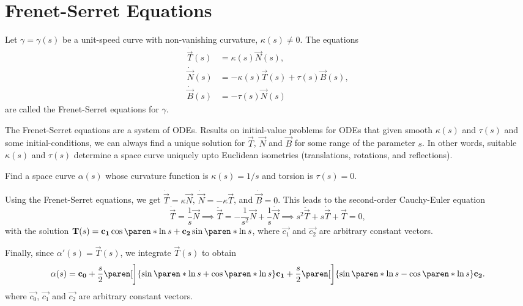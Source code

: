 \documentclass[11pt]{penrose}
\newcommand{\vT}{\vec{T}}
\newcommand{\vN}{\vec{N}}
\newcommand{\vB}{\vec{B}}
\newcommand{\keyword}[1]{\textsf{#1}}
\begin{document}
\section{Frenet-Serret Equations}

\begin{ndfn}
    Let $\gamma = \gamma(s)$ be a unit-speed curve with non-vanishing curvature, $\kappa(s) \neq 0$. The equations
    \begin{align}
        \dot{\vT}(s) &= \kappa(s) \vN(s),\\
        \dot{\vN}(s) &= -\kappa(s) \vT(s) + \tau(s) \vB(s),\\
        \dot{\vB}(s) &= -\tau(s) \vN(s)
    \end{align}
    are called the \keyword{Frenet-Serret equations} for $\gamma$.
\end{ndfn}

The Frenet-Serret equations are a system of ODEs. Results on initial-value problems for ODEs that given smooth $\kappa(s)$ and $\tau(s)$ and some initial-conditions, we can always find a unique solution for $\vT$, $\vN$ and $\vB$ for some range of the parameter $s$. In other words, suitable $\kappa(s)$ and $\tau(s)$ determine a space curve uniquely upto Euclidean isometries (translations, rotations, and reflections).

\begin{negg}
    Find a space curve $\alpha(s)$ whose curvature function is $\kappa(s) = 1/s$ and torsion is $\tau(s) = 0$.

    Using the Frenet-Serret equations, we get $\dot{\vT} = \kappa \vN$, $\dot{\vN} = - \kappa \vT$, and $\dot{\vB} = 0$. This leads to the second-order Cauchy-Euler equation
    \begin{equation}
        \dot{\vT} = \frac{1}{s} \vN
        \implies
        \ddot{\vT} = -\frac{1}{s^2} \vN + \frac{1}{s} \dot{\vN}
        \implies
        s^2 \ddot{\vT} + s \dot{\vT} + \vT = 0,
    \end{equation}
    with the solution $\vT(s) = \vec{c_1} \cos\paren*{\ln s} + \vec{c_2} \sin\paren*{\ln s}$, where $\vec{c_1}$ and $\vec{c_2}$ are arbitrary constant vectors.

    Finally, since $\alpha'(s) = \vT(s)$, we integrate $\vT(s)$ to obtain
    \begin{equation}
        \alpha(s) = \vec{c_0}
        + \frac{s}{2} \paren[\bigg]{\sin\paren*{\ln s} + \cos\paren*{\ln s}} \vec{c_1}
        + \frac{s}{2} \paren[\bigg]{\sin\paren*{\ln s} - \cos\paren*{\ln s}} \vec{c_2}.
    \end{equation}
    where $\vec{c_0}$, $\vec{c_1}$ and $\vec{c_2}$ are arbitrary constant vectors.
\end{negg}
\end{document}
